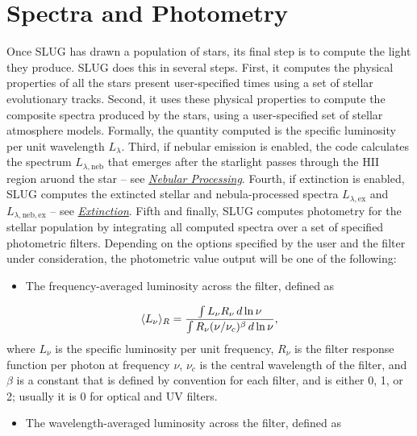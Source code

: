 \documentclass[letterpaper,10pt,english]{sphinxmanual}
\begin{document}
\section{Spectra and Photometry}
\label{intro:ssec-spec-phot}\label{intro:spectra-and-photometry}
Once SLUG has drawn a population of stars, its final step is to compute the light they produce. SLUG does this in several steps. First, it computes the physical properties of all the stars present user-specified times using a set of stellar evolutionary tracks. Second, it uses these physical properties to compute the composite spectra produced by the stars, using a user-specified set of stellar atmosphere models. Formally, the quantity computed is the specific luminosity per unit wavelength \(L_\lambda\). Third, if nebular emission is enabled, the code calculates the spectrum \(L_{\lambda,\mathrm{neb}}\) that emerges after the starlight passes through the HII region aruond the star -- see {\hyperref[intro:ssec\string-nebula]{\emph{Nebular Processing}}}. Fourth, if extinction is enabled, SLUG computes the extincted stellar and nebula-processed spectra \(L_{\lambda,\mathrm{ex}}\) and \(L_{\lambda,\mathrm{neb,ex}}\) -- see {\hyperref[intro:ssec\string-extinction]{\emph{Extinction}}}. Fifth and finally, SLUG computes photometry for the stellar population by integrating all computed spectra over a set of specified photometric filters. Depending on the options specified by the user and the filter under consideration, the photometric value output will be one of the following:
\begin{itemize}
\item {} 
The frequency-averaged luminosity across the filter, defined as

\end{itemize}
\begin{gather}
\begin{split}\langle L_\nu\rangle_R = \frac{\int L_\nu R_\nu \, d\ln\nu}{\int R_\nu (\nu/\nu_c)^\beta \, d\ln\nu},\end{split}\notag
\end{gather}
where \(L_\nu\) is the specific luminosity per unit frequency, \(R_\nu\) is the filter response function per photon at frequency \(\nu\), \(\nu_c\) is the central wavelength of the filter, and \(\beta\) is a constant that is defined by convention for each filter, and is either 0, 1, or 2; usually it is 0 for optical and UV filters.
\begin{itemize}
\item {} 
The wavelength-averaged luminosity across the filter, defined as

\end{itemize}
\end{document}
